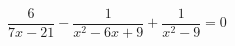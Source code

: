 \begin{ex}[type=equation]
	\begin{condition}
		$\dfrac{6}{7x -21} - \dfrac{1}{x^2 - 6x + 9} + \dfrac{1}{x^2 - 9} = 0$
	\end{condition}
\end{ex}